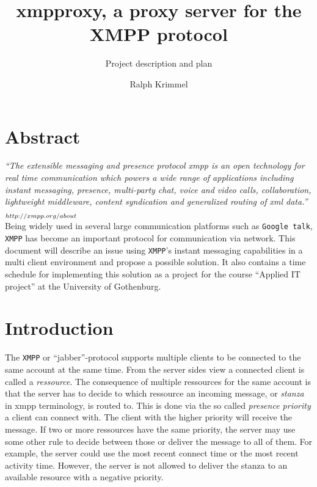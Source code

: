 \documentclass[a4paper,10pt,numbers=noendperiod]{scrartcl}
\author{Ralph Krimmel}
\title{xmpproxy, a proxy server for the XMPP protocol}
\subtitle{ Project description and plan }
\begin{document}
\maketitle{}
\thispagestyle{empty}
\newpage
\tableofcontents{}
\newpage
\section{Abstract}
\textit{``The extensible messaging and presence protocol xmpp is an open technology 
for real time communication which powers a wide range of applications including instant messaging, 
presence, multi-party chat, voice and video calls, collaboration, lightweight middleware, 
content syndication and generalized routing of xml data.''}   $_{\tiny http://xmpp.org/about}$ \\

Being widely used in several large communication platforms such as \texttt{Google talk},  %
\texttt{XMPP} has become an important protocol for communication via network. This document will describe an 
issue using \texttt{XMPP}'s instant messaging capabilities in a multi client environment and propose a possible solution.
It also contains a time schedule for implementing this solution as a project for the course ``Applied IT project'' at the University 
of Gothenburg.

\section{Introduction}
The \texttt{XMPP} or ``jabber''-protocol supports multiple clients to be connected to the same account at the same time. From the server sides view a connected client is called a \textit{ressource}. The consequence of multiple ressources for the same account is that the server has to decide to which ressource an incoming message, or \textit{stanza} in xmpp terminology, is routed to. This is done via the so called \textit{presence priority} a client can connect with.  The client with the higher priority will receive the message. 
If two or more ressources have the same priority, the server may use some other rule to decide between those or deliver the message to all of them. For example, the server could use the most recent connect time or the most recent activity time. However, the server is not allowed to deliver the stanza to an available resource with a negative priority. %
\end{document}
